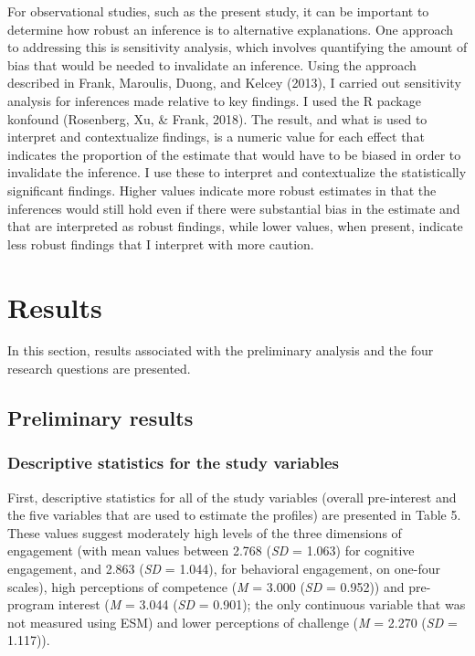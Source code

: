 \documentclass[]{msu-thesis}
\theoremstyle{definition}
\theoremstyle{definition}
\theoremstyle{definition}
\theoremstyle{remark}
\begin{document}
For observational studies, such as the present study, it can be
important to determine how robust an inference is to alternative
explanations. One approach to addressing this is sensitivity analysis,
which involves quantifying the amount of bias that would be needed to
invalidate an inference. Using the approach described in Frank,
Maroulis, Duong, and Kelcey (2013), I carried out sensitivity analysis
for inferences made relative to key findings. I used the R package
konfound (Rosenberg, Xu, \& Frank, 2018). The result, and what is used
to interpret and contextualize findings, is a numeric value for each
effect that indicates the proportion of the estimate that would have to
be biased in order to invalidate the inference. I use these to interpret
and contextualize the statistically significant findings. Higher values
indicate more robust estimates in that the inferences would still hold
even if there were substantial bias in the estimate and that are
interpreted as robust findings, while lower values, when present,
indicate less robust findings that I interpret with more caution.

\chapter{Results}\label{results}

In this section, results associated with the preliminary analysis and
the four research questions are presented.

\section{Preliminary results}\label{preliminary-results}

\subsection{Descriptive statistics for the study
variables}\label{descriptive-statistics-for-the-study-variables}

First, descriptive statistics for all of the study variables (overall
pre-interest and the five variables that are used to estimate the
profiles) are presented in Table 5. These values suggest moderately high
levels of the three dimensions of engagement (with mean values between
2.768 (\emph{SD} = 1.063) for cognitive engagement, and 2.863 (\emph{SD}
= 1.044), for behavioral engagement, on one-four scales), high
perceptions of competence (\emph{M} = 3.000 (\emph{SD} = 0.952)) and
pre-program interest (\emph{M} = 3.044 (\emph{SD} = 0.901); the only
continuous variable that was not measured using ESM) and lower
perceptions of challenge (\emph{M} = 2.270 (\emph{SD} = 1.117)).
\end{document}
